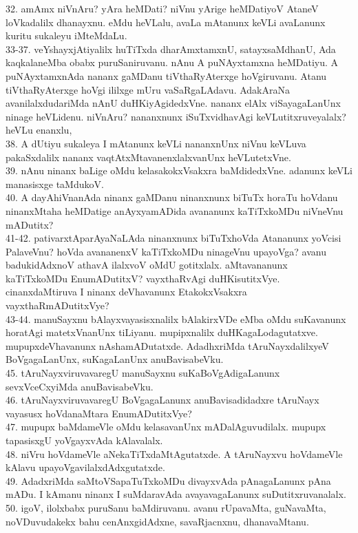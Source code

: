 \documentclass{article}
\begin{document}
32. amAmx niVnAru? yAra heMDati? niVnu yArige heMDatiyoV AtaneV loVkadalilx dhanayxnu. eMdu heVLalu, avaLa mAtanunx keVLi avaLanunx kuritu sukaleyu iMteMdaLu.\\
33-37. veYshayxjAtiyalilx huTiTxda dharAmxtamxnU, satayxsaMdhanU, Ada kaqkalaneMba obabx puruSaniruvanu. nAnu A puNAyxtamxna heMDatiyu. A puNAyxtamxnAda nananx gaMDanu tiVthaRyAterxge hoVgiruvanu. Atanu tiVthaRyAterxge hoVgi ililxge mUru vaSaRgaLAdavu. AdakAraNa avanilalxdudariMda nAnU duHKiyAgidedxVne. nananx elAlx viSayagaLanUnx ninage heVLidenu. niVnAru? nananxnunx iSuTxvidhavAgi keVLutitxruveyalalx? heVLu enanxlu,\\
38. A dUtiyu sukaleya I mAtanunx keVLi nananxnUnx niVnu keVLuva pakaSxdalilx nananx vaqtAtxMtavanenxlalxvanUnx heVLutetxVne.\\
39. nAnu ninanx baLige oMdu kelasakokxVsakxra baMdidedxVne. adanunx keVLi manasisxge taMdukoV.\\
40. A dayAhiVnanAda ninanx gaMDanu ninanxnunx biTuTx horaTu hoVdanu ninanxMtaha heMDatige anAyxyamADida avananunx kaTiTxkoMDu niVneVnu mADutitx?\\
41-42. pativarxtAparAyaNaLAda ninanxnunx biTuTxhoVda Atananunx yoVcisi PalaveVnu? hoVda avananenxV kaTiTxkoMDu ninageVnu upayoVga? avanu badukidAdxnoV athavA ilalxvoV oMdU gotitxlalx. aMtavananunx kaTiTxkoMDu EnumADutitxV? vayxthaRvAgi duHKisutitxVye. cinanxdaMtiruva I ninanx deVhavanunx EtakokxVsakxra vayxthaRmADutitxVye?\\
43-44. manuSayxnu bAlayxvayasisxnalilx bAlakirxVDe eMba oMdu suKavanunx horatAgi matetxVnanUnx tiLiyanu. mupipxnalilx duHKagaLodagutatxve. mupupxdeVhavanunx nAshamADutatxde. AdadhxriMda tAruNayxdalilxyeV BoVgagaLanUnx, suKagaLanUnx anuBavisabeVku.\\
45. tAruNayxviruvavaregU manuSayxnu suKaBoVgAdigaLanunx sevxVceCxyiMda anuBavisabeVku.\\
46. tAruNayxviruvavaregU BoVgagaLanunx anuBavisadidadxre tAruNayx vayasusx hoVdanaMtara EnumADutitxVye?\\
47. mupupx baMdameVle oMdu kelasavanUnx mADalAguvudilalx. mupupx tapasisxgU yoVgayxvAda kAlavalalx.\\
48. niVru hoVdameVle aNekaTiTxdaMtAgutatxde. A tAruNayxvu hoVdameVle kAlavu upayoVgavilalxdAdxgutatxde.\\
49. AdadxriMda saMtoVSapaTuTxkoMDu divayxvAda pAnagaLanunx pAna mADu. I kAmanu ninanx I suMdaravAda avayavagaLanunx suDutitxruvanalalx.\\
50. igoV, ilolxbabx puruSanu baMdiruvanu. avanu rUpavaMta, guNavaMta, noVDuvudakekx bahu cenAnxgidAdxne, savaRjacnxnu, dhanavaMtanu.\\
\end{document}
